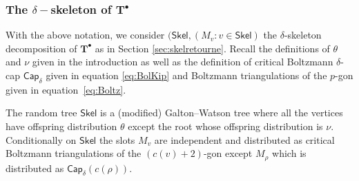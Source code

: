 \documentclass[10pt]{amsart}
\theoremstyle{definition}\newtheorem{defi}[theo]{Definition}\newtheorem{rema}[theo]{Remark}\newtheorem{exam}[theo]{Example}\newtheorem{exem}[theo]{Example}\newtheorem{nota}[theo]{Notation}
\begin{document}
\subsubsection{The \texorpdfstring{$\delta-$}{delta-}skeleton of \texorpdfstring{$\mathbf{T}^{\bullet}$}{T*}}
With the above notation, we consider $( \mathsf{Skel}, (M_{v} : v \in \mathsf{Skel} )$ the $\delta$-skeleton decomposition of $ \mathbf{T}^{\bullet}$ as in Section \ref{sec:skelretourne}. Recall the definitions of $\theta$ and $\nu$ given in the introduction as well as the definition of critical Boltzmann $\delta$-cap $\mathsf{Cap}_{\delta}$ given in equation \eqref{eq:BolKip} and Boltzmann triangulations of the $p$-gon given in equation~\eqref{eq:Boltz}.
\begin{proposition}
\label{prop:skelfinite}
The random tree $ \mathsf{Skel}$ is a (modified) Galton--Watson tree where all the vertices have offspring distribution $\theta$ except the root whose offspring distribution is $\nu$. Conditionally on $ \mathsf{Skel}$ the slots $M_{v}$ are independent and distributed as critical Boltzmann triangulations of the $(c(v)+2)$-gon except $M_{\rho}$ which is distributed as $\mathsf{Cap}_{\delta}(c(\rho))$.
\end{proposition}
\end{document}
